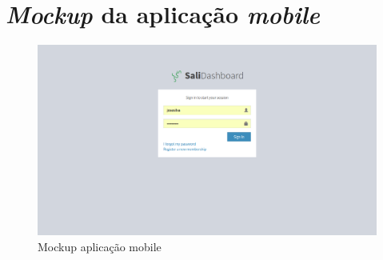 \chapter{\textit{Mockup} da aplicação \textit{mobile}}
\label{Mockup}

\begin{figure}[h]
	\centering
	\includegraphics[width=\linewidth]{prints-web/login.png}
	\caption{Mockup aplicação mobile}
	\label{dikw}
\end{figure}

